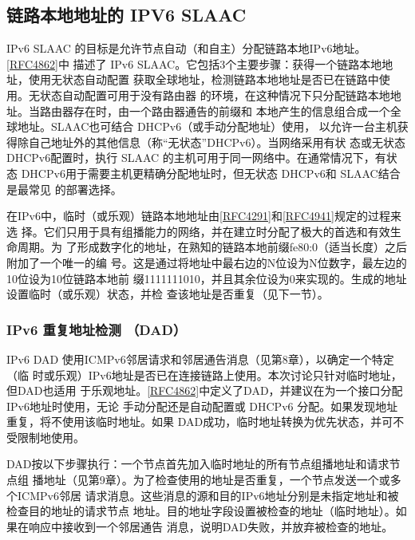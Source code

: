\subsection{链路本地地址的 IPV6 SLAAC}

IPv6 SLAAC 的目标是允许节点自动（和自主）分配链路本地IPv6地址。\href{https://www.rfc-editor.org/rfc/rfc4862}{\href{https://www.rfc-editor.org/rfc/rfc4862}{[RFC4862]}}中
描述了 IPv6 SLAAC。它包括3个主要步骤：获得一个链路本地地址，使用无状态自动配置
获取全球地址，检测链路本地地址是否已在链路中使用。无状态自动配置可用于没有路由器
的环境，在这种情况下只分配链路本地地址。当路由器存在时，由一个路由器通告的前缀和
本地产生的信息组合成一个全球地址。SLAAC也可结合 DHCPv6（或手动分配地址）使用，
以允许一台主机获得除自己地址外的其他信息（称“无状态”DHCPv6）。当网络采用有状
态或无状态 DHCPv6配置时，执行 SLAAC 的主机可用于同一网络中。在通常情况下，有状
态 DHCPv6用于需要主机更精确分配地址时，但无状态 DHCPv6和 SLAAC结合是最常见
的部署选择。

在IPv6中，临时（或乐观）链路本地地址由\href{https://www.rfc-editor.org/rfc/rfc4291}{\href{https://www.rfc-editor.org/rfc/rfc4291}{[RFC4291]}}和\href{https://www.rfc-editor.org/rfc/rfc4941}{\href{https://www.rfc-editor.org/rfc/rfc4941}{[RFC4941]}}规定的过程来选
择。它们只用于具有组播能力的网络，并在建立时分配了极大的首选和有效生命周期。为
了形成数字化的地址，在熟知的链路本地前缀fe80:0（适当长度）之后附加了一个唯一的编
号。这是通过将地址中最右边的N位设为N位数字，最左边的10位设为10位链路本地前
缀1111111010，并且其余位设为0来实现的。生成的地址设置临时（或乐观）状态，并检
查该地址是否重复（见下一节）。

\subsubsection{IPv6 重复地址检测 （DAD）}
IPv6 DAD 使用ICMPv6邻居请求和邻居通告消息（见第8章），以确定一个特定（临
时或乐观）IPv6地址是否已在连接链路上使用。本次讨论只针对临时地址，但DAD也适用
于乐观地址。\href{https://www.rfc-editor.org/rfc/rfc4862}{\href{https://www.rfc-editor.org/rfc/rfc4862}{[RFC4862]}}中定义了DAD，并建议在为一个接口分配 IPv6地址时使用，无论
手动分配还是自动配置或 DHCPv6 分配。如果发现地址重复，将不使用该临时地址。如果
DAD成功，临时地址转换为优先状态，并可不受限制地使用。

DAD按以下步骤执行：一个节点首先加入临时地址的所有节点组播地址和请求节点组
播地址（见第9章）。为了检查使用的地址是否重复，一个节点发送一个或多个ICMPv6邻居
请求消息。这些消息的源和目的IPv6地址分别是未指定地址和被检查目的地址的请求节点
地址。目的地址字段设置被检查的地址（临时地址）。如果在响应中接收到一个邻居通告
消息，说明DAD失败，并放弃被检查的地址。

